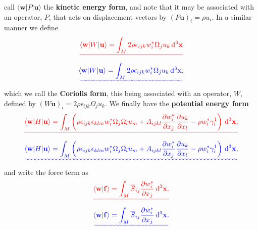\documentclass[a4paper,12pt]{paper}
\providecommand{\DIFadd}[1]{{\protect\color{blue}\uwave{#1}}} %
\providecommand{\DIFdel}[1]{{\protect\color{red}\sout{#1}}}                      %
\providecommand{\DIFaddbegin}{} %
\providecommand{\DIFaddend}{} %
\providecommand{\DIFdelbegin}{} %
\providecommand{\DIFdelend}{} %
\begin{document}
call $\langle \mathbf{w}|P|\mathbf{u}\rangle$ the \textbf{kinetic energy form}, and note that it may be associated with an operator, $P$, 
that acts on displacement vectors by $(P\mathbf{u})_{i}=\rho u_{i}$. In a similar manner we define
\DIFdelbegin \begin{displaymath}
\DIFdel{\langle \mathbf{w}|W|\mathbf{u}\rangle=\int_{M}2\rho\epsilon_{ijk}w_{i}^{*}\Omega_{j}u_{k}\dd^{3}\mathbf{x}
}\end{displaymath}%
\DIFdelend \DIFaddbegin \begin{equation}
\DIFadd{\langle \mathbf{w}|W|\mathbf{u}\rangle=\int_{M}2\rho\epsilon_{ijk}w_{i}^{*}\Omega_{j}u_{k}\dd^{3}\mathbf{x},
\label{eq:8}
}\end{equation}\DIFaddend 
which we call the \textbf{Coriolis form}, this being associated with an operator, $W$, defined by $(W\mathbf{u})_{i}=2\rho\epsilon_{ijk}\Omega_{j}u_{k}$.
We finally have the \textbf{potential energy form}
\DIFdelbegin \begin{displaymath}
\DIFdel{\langle \mathbf{w}|H|\mathbf{u}\rangle=\int_{M}\left(\rho\epsilon_{ijk}\epsilon_{klm}w_{i}^{*}\Omega_{j}\Omega_{l}u_{m}+A_{ijkl}\frac{\partial w_{i}^{*}}{\partial x_{j}}\frac{\partial u_{k}}{\partial x_{l}}-\rho w_{i}^{*}\gamma_{i}^{1}\right)\dd^{3}\mathbf{x},
}\end{displaymath}%
\DIFdelend \DIFaddbegin \begin{equation}
\DIFadd{\langle \mathbf{w}|H|\mathbf{u}\rangle=\int_{M}\left(\rho\epsilon_{ijk}\epsilon_{klm}w_{i}^{*}\Omega_{j}\Omega_{l}u_{m}+A_{ijkl}\frac{\partial w_{i}^{*}}{\partial x_{j}}\frac{\partial u_{k}}{\partial x_{l}}-\rho w_{i}^{*}\gamma_{i}^{1}\right)\dd^{3}\mathbf{x},
\label{eq:9}
}\end{equation}\DIFaddend 
and write the force term as
\DIFdelbegin \begin{displaymath}
\DIFdel{\langle \mathbf{w}|\mathbf{f}\rangle=\int_{M}\overline{S}_{ij}\frac{\partial w_{i}^{*}}{\partial x_{j}}\dd^{3}\mathbf{x}.
}\end{displaymath}%
\DIFdelend \DIFaddbegin \begin{equation}
\DIFadd{\langle \mathbf{w}|\mathbf{f}\rangle=\int_{M}\overline{S}_{ij}\frac{\partial w_{i}^{*}}{\partial x_{j}}\dd^{3}\mathbf{x}.
\label{eq:10}
}\end{equation}\DIFaddend 
\end{document}
